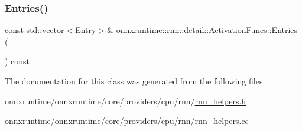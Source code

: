 \subsubsection{\texorpdfstring{Entries()}{Entries()}}
{\footnotesize\ttfamily const std\+::vector$<$\mbox{\hyperlink{structonnxruntime_1_1rnn_1_1detail_1_1ActivationFuncs_1_1Entry}{Entry}}$>$\& onnxruntime\+::rnn\+::detail\+::\+Activation\+Funcs\+::\+Entries (\begin{DoxyParamCaption}{ }\end{DoxyParamCaption}) const\hspace{0.3cm}{\ttfamily [inline]}}



The documentation for this class was generated from the following files\+:\begin{DoxyCompactItemize}
\item 
onnxruntime/onnxruntime/core/providers/cpu/rnn/\mbox{\hyperlink{rnn__helpers_8h}{rnn\+\_\+helpers.\+h}}\item 
onnxruntime/onnxruntime/core/providers/cpu/rnn/\mbox{\hyperlink{rnn__helpers_8cc}{rnn\+\_\+helpers.\+cc}}\end{DoxyCompactItemize}
